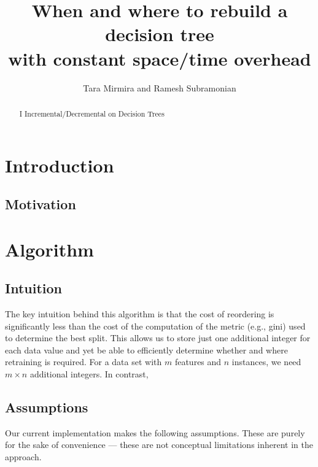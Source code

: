\documentclass[12pt,letterpaper]{article}
\begin{document}
\title{When and where to rebuild a decision tree \\
with constant space/time overhead}
\author{Tara Mirmira and Ramesh Subramonian}
\maketitle
\thispagestyle{fancy}
\lhead{}
\chead{}
\rhead{}
\lfoot{}
\rfoot{{\small \thepage}}

\begin{abstract}
I Incremental/Decremental on Decision Trees
\end{abstract}

\section{Introduction}

\TBC

\subsection{Motivation}
\TBC

\section{Algorithm}

\subsection{Intuition}

The key intuition behind this algorithm is that the cost of reordering is
significantly less
than the cost of the computation of the metric (e.g., gini) used to determine
the best split. This allows us to store just one additional integer for 
each data value and yet be able to efficiently determine whether and where retraining is
required. For a data set with \(m\) features and \(n\) instances, we need \(m
\times n\) additional integers. In contrast, \TBC \cite{Brophy2021}
\subsection{Assumptions}

Our current implementation makes the following assumptions. These are purely for
the sake of convenience --- these are not conceptual limitations inherent in
the approach.
\end{document}
